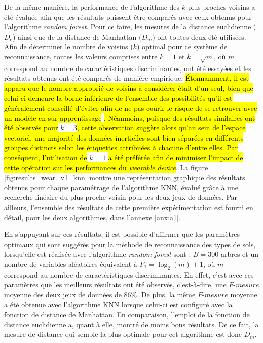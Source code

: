 De la même manière, la performance de l'algorithme des $k$ plus proches voisins a été évaluée afin que les résultats puissent être comparés avec ceux obtenus pour l'algorithme \textit{random forest}. Pour ce faire, les mesures de la distance euclidienne ($D_e$) ainsi que de la distance de Manhattan ($D_m$) ont toutes deux été utilisées. Afin de déterminer le nombre de voisins ($k$) optimal pour ce système de reconnaissance, toutes les valeurs comprises entre $k=1$ et $k=\sqrt{m}$, où $m$ correspond au nombre de caractéristiques discriminantes, ont été essayées et les résultats obtenus ont été comparés de manière empirique. \hl{Étonnamment, il est apparu que le nombre approprié de voisins à considérer était d'un seul, bien que celui-ci demeure la borne inférieure de l'ensemble des possibilités qu'il est généralement conseillé d'éviter afin de ne pas courir le risque de se retrouver avec un modèle en sur-apprentissage} \citep{Duda2000}\hl{. Néanmoins, puisque des résultats similaires ont été observés pour} $k=3$\hl{, cette observation suggère alors qu'au sein de l'espace vectoriel, une majorité des données inertielles sont bien séparées en différents groupes distincts selon les étiquettes attribuées à chacune d'entre elles. Par conséquent, l'utilisation de} $k=1$ \hl{a été préférée afin de minimiser l'impact de cette opération sur les performances du \textit{wearable device}}. La figure \ref{fig:results_wear_v1_knn} montre une représentation graphique des résultats obtenus pour chaque paramétrage de l'algorithme \acs{KNN}, évalué grâce à une recherche linéaire du plus proche voisin pour les deux jeux de données. Par ailleurs, l'ensemble des résultats de cette première expérimentation est fourni en détail, pour les deux algorithmes, dans l'annexe \ref{anx:a1}.

En s'appuyant sur ces résultats, il est possible d'affirmer que les paramètres optimaux qui sont suggérés pour la méthode de reconnaissance des types de sols, lorsqu'elle est réalisée avec l'algorithme \textit{random forest} sont : $B=300$ arbres et un nombre de variables aléatoires équivalent à $F_1=\log_2(m) + 1$, où $m$ correspond au nombre de caractéristiques discriminantes. En effet, c'est avec ces paramètres que les meilleurs résultats ont été observés, c'est-à-dire, une $F\mbox{-}mesure$ moyenne des deux jeux de données de $86\%$. De plus, la même $F\mbox{-}mesure$ moyenne a été obtenue avec l'algorithme \acs{KNN} lorsque celui-ci est configuré avec la fonction de distance de Manhattan. En comparaison, l'emploi de la fonction de distance euclidienne a, quant à elle, montré de moins bons résultats. De ce fait, la mesure de distance qui semble la plus optimale pour cet algorithme est donc $D_m$.

